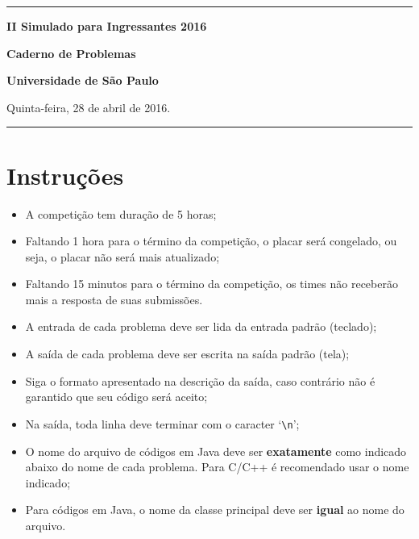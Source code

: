 \documentclass[a4paper,11pt]{article}
\begin{document}

\begin{center}
\noindent

\hrule

\vspace{3.0cm}

\begin{Huge}
  {\bf II Simulado para Ingressantes 2016}
\end{Huge}

\vspace{6.0cm}

\begin{Huge}
{\bf Caderno de Problemas}
\end{Huge}

\vspace{6.0cm}

\begin{Large}
	{\bf Universidade de São Paulo}
\end{Large}

\vfill


Quinta-feira, 28 de abril de 2016.

\vfill
\hrule
\end{center}

\thispagestyle{empty}

\newpage

\section*{Instruções}

\begin{itemize}
	\item A competição tem duração de 5 horas;
	\item Faltando 1 hora para o término da competição, o placar será congelado, ou seja, o placar 
	não será mais atualizado;
	\item Faltando 15 minutos para o término da competição, os times não receberão mais a resposta
	de suas submissões.
\end{itemize}

\vspace*{0.5cm}

\begin{itemize}
	\item A entrada de cada problema deve ser lida da entrada padrão (teclado);
	\item A saída de cada problema deve ser escrita na saída padrão (tela);
	\item Siga o formato apresentado na descrição da saída, caso contrário não é garantido que seu
	código será aceito;
	\item Na saída, toda linha deve terminar com o caracter `\texttt{\textbackslash n}';
	\item O nome do arquivo de códigos em Java deve ser \textbf{exatamente} como indicado abaixo
	do nome de cada problema. Para C/C++ é recomendado usar o nome indicado;
	\item Para códigos em Java, o nome da classe principal deve ser \textbf{igual} ao nome do
	arquivo.
\end{itemize}
\end{document}
